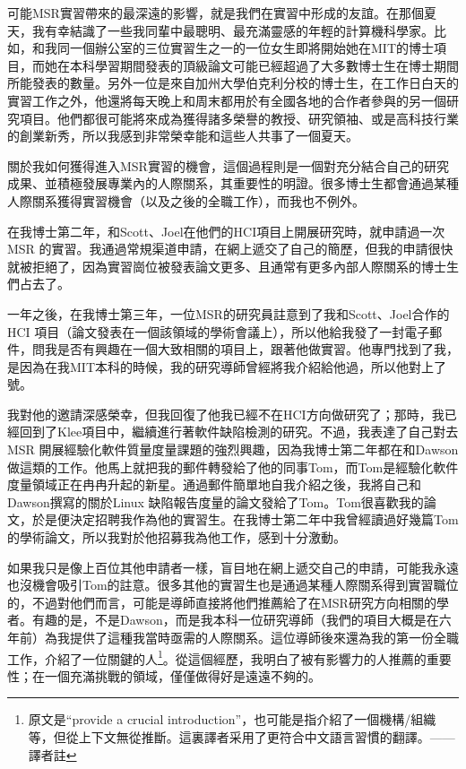 \documentclass[12pt,UTF8,nofonts]{book}
\begin{document}
可能MSR實習帶來的最深遠的影響，就是我們在實習中形成的友誼。在那個夏天，我有幸結識了一些我同輩中最聰明、最充滿靈感的年輕的計算機科學家。比如，和我同一個辦公室的三位實習生之一的一位女生即將開始她在MIT的博士項目，而她在本科學習期間發表的頂級論文可能已經超過了大多數博士生在博士期間所能發表的數量。另外一位是來自加州大學伯克利分校的博士生，在工作日白天的實習工作之外，他還將每天晚上和周末都用於有全國各地的合作者參與的另一個研究項目。他們都很可能將來成為獲得諸多榮譽的教授、研究領袖、或是高科技行業的創業新秀，所以我感到非常榮幸能和這些人共事了一個夏天。

\breakline

關於我如何獲得進入MSR實習的機會，這個過程則是一個對充分結合自己的研究成果、並積極發展專業內的人際關系，其重要性的明證。很多博士生都會通過某種人際關系獲得實習機會（以及之後的全職工作），而我也不例外。

在我博士第二年，和Scott、Joel在他們的HCI項目上開展研究時，就申請過一次MSR 的實習。我通過常規渠道申請，在網上遞交了自己的簡歷，但我的申請很快就被拒絕了，因為實習崗位被發表論文更多、且通常有更多內部人際關系的博士生們占去了。

一年之後，在我博士第三年，一位MSR的研究員註意到了我和Scott、Joel合作的HCI 項目（論文發表在一個該領域的學術會議上），所以他給我發了一封電子郵件，問我是否有興趣在一個大致相關的項目上，跟著他做實習。他專門找到了我，是因為在我MIT本科的時候，我的研究導師曾經將我介紹給他過，所以他對上了號。

我對他的邀請深感榮幸，但我回復了他我已經不在HCI方向做研究了；那時，我已經回到了Klee項目中，繼續進行著軟件缺陷檢測的研究。不過，我表達了自己對去MSR 開展經驗化軟件質量度量課題的強烈興趣，因為我博士第二年都在和Dawson做這類的工作。他馬上就把我的郵件轉發給了他的同事Tom，而Tom是經驗化軟件度量領域正在冉冉升起的新星。通過郵件簡單地自我介紹之後，我將自己和Dawson撰寫的關於Linux 缺陷報告度量的論文發給了Tom。Tom很喜歡我的論文，於是便決定招聘我作為他的實習生。在我博士第二年中我曾經讀過好幾篇Tom的學術論文，所以我對於他招募我為他工作，感到十分激動。

如果我只是像上百位其他申請者一樣，盲目地在網上遞交自己的申請，可能我永遠也沒機會吸引Tom的註意。很多其他的實習生也是通過某種人際關系得到實習職位的，不過對他們而言，可能是導師直接將他們推薦給了在MSR研究方向相關的學者。有趣的是，不是Dawson，而是我本科一位研究導師（我們的項目大概是在六年前）為我提供了這種我當時亟需的人際關系。這位導師後來還為我的第一份全職工作，介紹了一位關鍵的人\footnote{原文是``provide a crucial introduction''，也可能是指介紹了一個機構/組織等，但從上下文無從推斷。這裏譯者采用了更符合中文語言習慣的翻譯。——譯者註}。從這個經歷，我明白了被有影響力的人推薦的重要性；在一個充滿挑戰的領域，僅僅做得好是遠遠不夠的。
\end{document}
